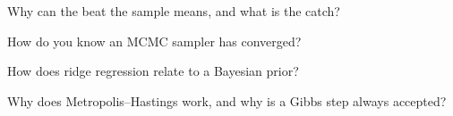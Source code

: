 \begin{interviewq}\label{iq:qm:bayesian-methods:3}
Why can the  beat the sample means, and what is the catch?
\end{interviewq}

\begin{interviewq}\label{iq:qm:bayesian-methods:4}
How do you know an MCMC sampler has converged?
\end{interviewq}

\begin{interviewq}\label{iq:qm:bayesian-methods:5}
How does ridge regression relate to a Bayesian prior?
\end{interviewq}

\begin{interviewq}\label{iq:qm:bayesian-methods:6}
Why does Metropolis--Hastings work, and why is a Gibbs step always accepted?
\end{interviewq}
